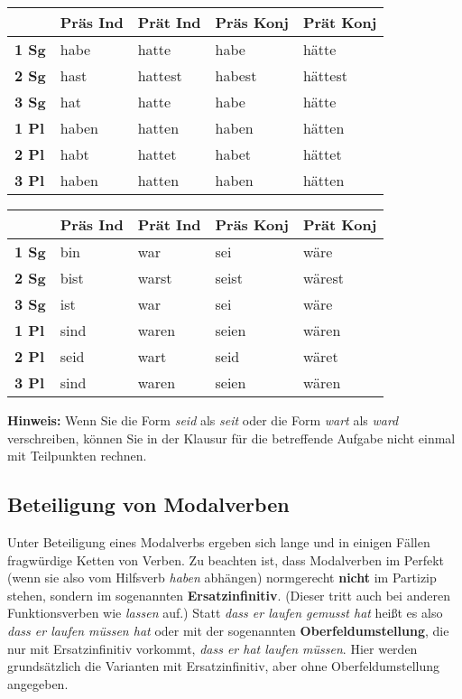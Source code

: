 \begin{center}
  \begin{tabular}{lllll}
    \toprule
    & \textbf{Präs Ind} & \textbf{Prät Ind} & \textbf{Präs Konj} & \textbf{Prät Konj} \\
    \midrule
    \textbf{1 Sg} & habe  & hatte   & habe   & hätte \\
    \textbf{2 Sg} & hast  & hattest & habest & hättest \\
    \textbf{3 Sg} & hat   & hatte   & habe   & hätte \\
    \textbf{1 Pl} & haben & hatten  & haben  & hätten \\
    \textbf{2 Pl} & habt  & hattet  & habet  & hättet \\
    \textbf{3 Pl} & haben & hatten  & haben  & hätten \\
    \bottomrule
  \end{tabular}
\end{center}

\begin{center}
  \begin{tabular}{lllll}
    \toprule
    & \textbf{Präs Ind} & \textbf{Prät Ind} & \textbf{Präs Konj} & \textbf{Prät Konj} \\
    \midrule
    \textbf{1 Sg} & bin   & war     & sei    & wäre   \\
    \textbf{2 Sg} & bist  & warst   & seist  & wärest \\
    \textbf{3 Sg} & ist   & war     & sei    & wäre   \\
    \textbf{1 Pl} & sind  & waren   & seien  & wären  \\
    \textbf{2 Pl} & seid  & wart    & seid   & wäret  \\
    \textbf{3 Pl} & sind  & waren   & seien  & wären \\
    \bottomrule
  \end{tabular}
\end{center}

\textbf{Hinweis:} Wenn Sie die Form \textit{seid} als \textit{seit} oder die Form \textit{wart} als \textit{ward} verschreiben, können Sie in der Klausur für die betreffende Aufgabe nicht einmal mit Teilpunkten rechnen.

\subsection{Beteiligung von Modalverben}

Unter Beteiligung eines Modalverbs ergeben sich lange und in einigen Fällen fragwürdige Ketten von Verben.
Zu beachten ist, dass Modalverben im Perfekt (wenn sie also vom Hilfsverb \textit{haben} abhängen) normgerecht \textbf{nicht} im Partizip stehen, sondern im sogenannten \textbf{Ersatzinfinitiv}.
(Dieser tritt auch bei anderen Funktionsverben wie \textit{lassen} auf.)
Statt \textit{dass er laufen gemusst hat} heißt es also \textit{dass er laufen müssen hat} oder mit der sogenannten \textbf{Oberfeldumstellung}, die nur mit Ersatzinfinitiv vorkommt, \textit{dass er hat laufen müssen}.
Hier werden grundsätzlich die Varianten mit Ersatzinfinitiv, aber ohne Oberfeldumstellung angegeben.

